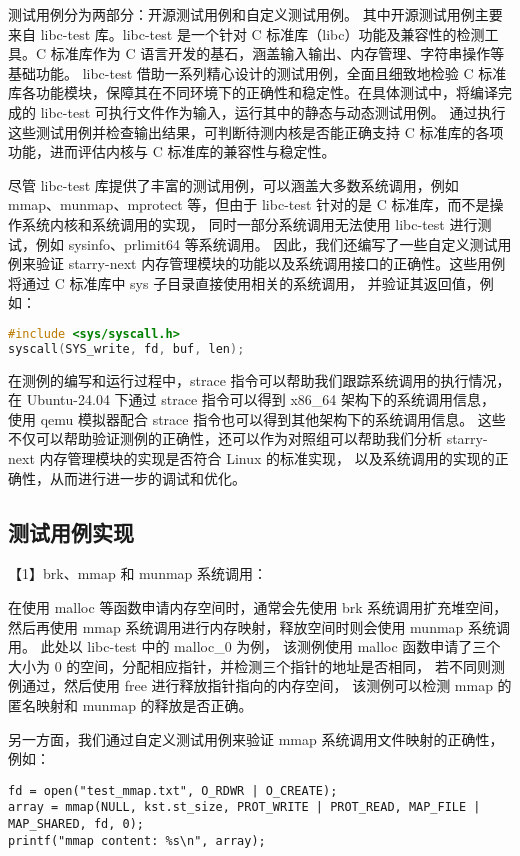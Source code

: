 测试用例分为两部分：开源测试用例和自定义测试用例。
其中开源测试用例主要来自 libc-test 库。libc-test 是一个针对 C 标准库（libc）功能及兼容性的检测工具。C 标准库作为 C 语言开发的基石，涵盖输入输出、内存管理、字符串操作等基础功能。
libc-test 借助一系列精心设计的测试用例，全面且细致地检验 C 标准库各功能模块，保障其在不同环境下的正确性和稳定性。在具体测试中，将编译完成的 libc-test 可执行文件作为输入，运行其中的静态与动态测试用例。
通过执行这些测试用例并检查输出结果，可判断待测内核是否能正确支持 C 标准库的各项功能，进而评估内核与 C 标准库的兼容性与稳定性。

尽管 libc-test 库提供了丰富的测试用例，可以涵盖大多数系统调用，例如 mmap、munmap、mprotect 等，但由于 libc-test 针对的是 C 标准库，而不是操作系统内核和系统调用的实现，
同时一部分系统调用无法使用 libc-test 进行测试，例如 sysinfo、prlimit64 等系统调用。
因此，我们还编写了一些自定义测试用例来验证 starry-next 内存管理模块的功能以及系统调用接口的正确性。这些用例将通过 C 标准库中 sys 子目录直接使用相关的系统调用，
并验证其返回值，例如：

\begin{lstlisting}[language=c, caption=直接使用系统调用进行测试的示例]
#include <sys/syscall.h>
syscall(SYS_write, fd, buf, len);
\end{lstlisting}

在测例的编写和运行过程中，strace 指令可以帮助我们跟踪系统调用的执行情况，在 Ubuntu-24.04 下通过 strace 指令可以得到 x86\_64 架构下的系统调用信息，
使用 qemu 模拟器配合 strace 指令也可以得到其他架构下的系统调用信息。
这些不仅可以帮助验证测例的正确性，还可以作为对照组可以帮助我们分析 starry-next 内存管理模块的实现是否符合 Linux 的标准实现，
以及系统调用的实现的正确性，从而进行进一步的调试和优化。

\subsection{测试用例实现}

【1】brk、mmap 和 munmap 系统调用：

在使用 malloc 等函数申请内存空间时，通常会先使用 brk 系统调用扩充堆空间，
然后再使用 mmap 系统调用进行内存映射，释放空间时则会使用 munmap 系统调用。
此处以 libc-test 中的 malloc\_0 为例，
该测例使用 malloc 函数申请了三个大小为 0 的空间，分配相应指针，并检测三个指针的地址是否相同，
若不同则测例通过，然后使用 free 进行释放指针指向的内存空间，
该测例可以检测 mmap 的匿名映射和 munmap 的释放是否正确。

另一方面，我们通过自定义测试用例来验证 mmap 系统调用文件映射的正确性，例如：
\begin{lstlisting}[caption=自定义 mmap 测例中调用 mmap 进行文件映射]
fd = open("test_mmap.txt", O_RDWR | O_CREATE);
array = mmap(NULL, kst.st_size, PROT_WRITE | PROT_READ, MAP_FILE | MAP_SHARED, fd, 0);
printf("mmap content: %s\n", array);
\end{lstlisting}

